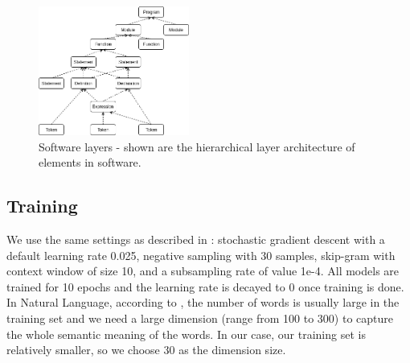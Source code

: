 \begin{table}
	
	
	\caption{Overview of our training data set}
	\label{tab:dataset}
\end{table}
\begin{figure}[t!]
	\includegraphics[width=0.44\textwidth]{software_layers}
	
	\caption{Software layers - shown are the hierarchical layer architecture of elements in software.}
	\label{figure:softwarelayers}
	\medskip
\end{figure}
\subsection{Training}
We use the same settings as described in \cite{mikolov2013distributed}: stochastic gradient descent with a default learning rate 0.025, negative sampling with 30 samples, skip-gram with context window of size 10, and a subsampling rate of value 1e-4. All models are trained for 10 epochs and the learning rate is decayed to 0 once training is done. In Natural Language, according to \cite{pennington2014glove}, the number of words is usually large in the training set and we need a large dimension (range from 100 to 300) to capture the whole semantic meaning of the words. In our case, our training set is relatively smaller, so we choose 30 as the dimension size.
